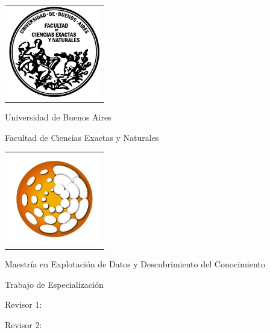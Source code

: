 \newcommand{\HRule}{\rule{\linewidth}{0.2mm}}
%
\thispagestyle{empty}

\begin{center}\leavevmode

\vspace{-2cm}

\begin{tabular}{l}
\includegraphics[width=4cm]{caratula/logofcen.pdf}
\end{tabular}

{\large \sc Universidad de Buenos Aires

Facultad de Ciencias Exactas y Naturales}


\begin{tabular}{l}
\includegraphics[width=4cm]{caratula/logo_UBA_DM.jpeg}
\end{tabular}

{\large \sc Maestría en Explotación de Datos y Descubrimiento del Conocimiento}


\vspace{4.0cm}


\begin{huge}
\textbf{\tituloTesis}
\end{huge}

\vspace{2cm}

{\large Trabajo de Especialización}

\vspace{2cm}

{\Large \autor}

\end{center}

\vfill

{\large

{Revisor 1: \director}

\vspace{.2cm}

{Revisor 2: \codirector}

\vspace{.2cm}

\lugar
}

\newpage\thispagestyle{empty}
